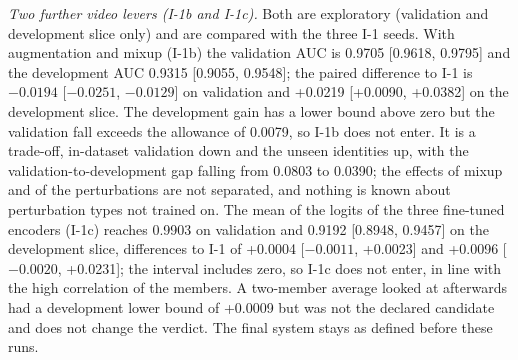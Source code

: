 \documentclass[conference,a4paper]{IEEEtran_nodash}
\begin{document}
\emph{Two further video levers (I-1b and I-1c).} Both are exploratory
(validation and development slice only) and are compared with the three I-1
seeds. With augmentation and mixup (I-1b) the validation AUC is 0.9705 [0.9618,
0.9795] and the development AUC 0.9315 [0.9055, 0.9548]; the paired difference
to I-1 is $-0.0194$ [$-0.0251$, $-0.0129$] on validation and +0.0219 [+0.0090,
+0.0382] on the development slice. The development gain has a lower bound above
zero but the validation fall exceeds the allowance of 0.0079, so I-1b does not
enter. It is a trade-off, in-dataset validation down and the unseen identities
up, with the validation-to-development gap falling from 0.0803 to 0.0390; the
effects of mixup and of the perturbations are not separated, and nothing is
known about perturbation types not trained on. The mean of the logits of the
three fine-tuned encoders (I-1c) reaches 0.9903 on validation and 0.9192 [0.8948,
0.9457] on the development slice, differences to I-1 of +0.0004 [$-0.0011$,
+0.0023] and +0.0096 [$-0.0020$, +0.0231]; the interval includes zero, so I-1c
does not enter, in line with the high correlation of the members. A two-member
average looked at afterwards had a development lower bound of +0.0009 but was
not the declared candidate and does not change the verdict. The final system
stays as defined before these runs. %
\end{document}
